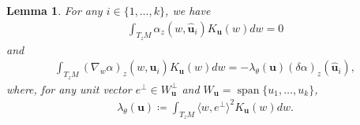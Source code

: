 \documentclass[11pt,reqno]{amsproc}
\numberwithin{equation}{section}
\newcommand{\bu}{\mathbf{u}}
\newcommand{\spann}{\operatorname{span}}
\newtheorem{lemma}[counter]{Lemma}
\theoremstyle{definition}
\theoremstyle{plain}
\begin{document}
\begin{lemma} \label{lem:codiff_moment_trace}
    For any $i\in\{1,\ldots,k\}$, we have
    \begin{align} \label{eq:codiff_moment_trace_formulas}
        \int_{T_zM} \alpha_z(w, \hat{\bu}_i)K_\bu(w)dw = 0
    \end{align}
    and
    \begin{align}
        \int_{T_zM} (\nabla_w\alpha)_z(w,\hat{\bu}_i)K_\bu(w)dw
        = -\lambda_\theta(\bu)(\delta\alpha)_z(\hat{\bu}_i),
    \end{align}
    where, for any unit vector $e^\perp\in W_\bu^\perp$ and $W_\bu=\spann\{u_1,\ldots,u_k\}$,
    \begin{align}
        \lambda_\theta(\bu)\coloneqq \int_{T_zM}\langle w,e^\perp\rangle^2K_\bu(w)dw.
    \end{align}
\end{lemma}
\end{document}
